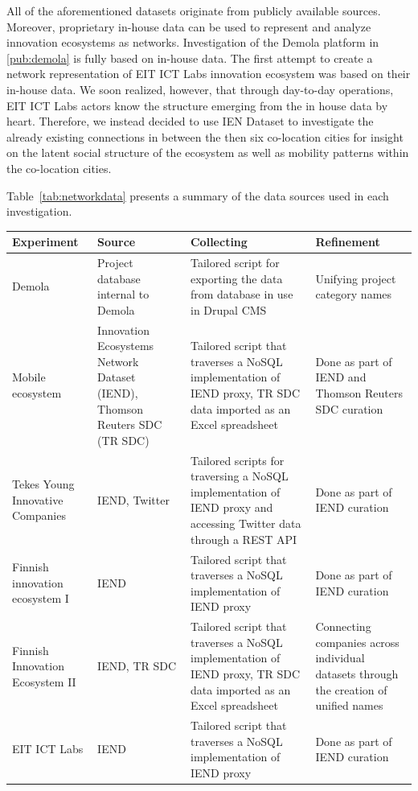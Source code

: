 All of the aforementioned datasets originate from publicly available sources. Moreover, proprietary in-house data can be used to represent and analyze innovation ecosystems as networks. Investigation of the Demola platform in \ref{pub:demola} is fully based on in-house data. The first attempt to create a network representation of EIT ICT Labs innovation ecosystem was based on their in-house data. We soon realized, however, that through day-to-day operations, EIT ICT Labs actors know the structure emerging from the in house data by heart. Therefore, we instead decided to use IEN Dataset to investigate the already existing connections in between the then six co-location cities for insight on the latent social structure of the ecosystem as well as  mobility patterns within the co-location cities.

Table~\ref{tab:networkdata} presents a summary of the data sources used in each investigation.

\begingroup
{}\label{tab:networkdata}
\begin{tabular}{p{2cm} p{3cm} p{4cm} p{3cm}}
\toprule
Experiment & Source & Collecting & Refinement \\
\midrule

Demola &
Project database internal to Demola &
Tailored script for exporting the data from database in use in Drupal CMS &
Unifying project category names \\

Mobile ecosystem &
Innovation Ecosystems Network Dataset (IEND), Thomson Reuters SDC (TR SDC) &
Tailored script that traverses a NoSQL implementation of IEND proxy, TR SDC data imported as an Excel spreadsheet &
Done as part of IEND and Thomson Reuters SDC curation \\

Tekes Young Innovative Companies &
IEND, Twitter &
Tailored scripts for traversing a NoSQL implementation of IEND proxy and accessing Twitter data through a REST API &
Done as part of IEND curation \\

Finnish innovation ecosystem I & 
IEND & 
Tailored script that traverses a NoSQL implementation of IEND proxy &
Done as part of IEND curation \\

Finnish Innovation Ecosystem II  &
IEND, TR SDC &
Tailored script that traverses a NoSQL implementation of IEND proxy, TR SDC data imported as an Excel spreadsheet &
Connecting companies across individual datasets through the creation of unified names \\

EIT ICT Labs &
IEND &
Tailored script that traverses a NoSQL implementation of IEND proxy &
 Done as part of IEND curation \\
\bottomrule
\end{tabular}
\endgroup

